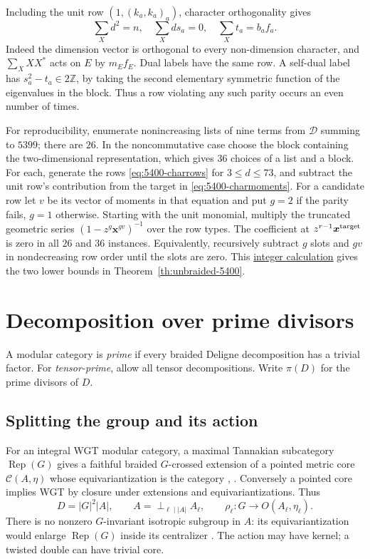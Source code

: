 \documentclass[11pt,a4paper]{article}
\numberwithin{equation}{section}
\theoremstyle{remark}
\newcommand{\C}{\mathcal C}
\newcommand{\Rep}{\operatorname{Rep}}
\newcommand{\ZZ}{\mathbb Z}
\begin{document}
Including the unit row $(1,(k_a,k_a)_a)$, character orthogonality gives
\begin{equation}\label{eq:5400-charmoments}
 \sum_X d^2=n,\quad \sum_X ds_a=0,\quad
 \sum_X t_a=b_a f_a .
\end{equation}
Indeed the dimension vector is orthogonal to every non-dimension
character, and $\sum_X XX^*$ acts on $E$ by $m_Ef_E$.
Dual labels have the same row. A self-dual label has
$s_a^2-t_a\in2\ZZ$, by taking the second elementary symmetric function
of the eigenvalues in the block. Thus a row violating any such parity
occurs an even number of times.

For reproducibility, enumerate nonincreasing lists of nine terms from
$\mathcal D$ summing to $5399$; there are $26$. In the noncommutative
case choose the block containing the two-dimensional representation,
which gives $36$ choices of a list and a block. For each, generate the
rows \eqref{eq:5400-charrows} for $3\le d\le73$, and subtract the unit
row's contribution from the target in \eqref{eq:5400-charmoments}.
For a candidate row let $v$ be its vector of moments in that equation
and put $g=2$ if the parity fails, $g=1$ otherwise.
Starting with the unit monomial, multiply the truncated geometric
series $(1-z^g\boldsymbol{x}^{gv})^{-1}$ over the row types.
The coefficient at $z^{r-1}\boldsymbol{x}^{\rm target}$
is zero in all $26$ and $36$ instances. Equivalently, recursively
subtract $g$ slots and $gv$ in nondecreasing row order until the slots
are zero. This \href{https://github.com/sebastienpalcoux/WGT-fusion-categories/blob/f7f9f9a02f3116e61eb9dca4eebfed77001494e8/code/verify_rank_5400.py}{integer calculation} gives the two lower bounds in
Theorem~\ref{th:unbraided-5400}.

\section{Decomposition over prime divisors}\label{fam:M:sec:13}\label{sec:coprime-core}
A modular category is \emph{prime} if every braided Deligne
decomposition has a trivial factor. For \emph{tensor-prime}, allow
all tensor decompositions. Write $\pi(D)$ for the prime divisors of $D$.
\subsection{Splitting the group and its action}\label{fam:M:sec:13.1}
For an integral WGT modular category, a maximal Tannakian subcategory
$\Rep(G)$ gives a faithful braided $G$-crossed extension of a pointed
metric core $\C(A,\eta)$ whose equivariantization is the category
\cite[Proposition~4.56(i)--(ii), Definition~5.8 and Corollary~5.19]{DGNO},
\cite[Theorem~1.1]{NataleCore}. Conversely a pointed core implies WGT
by closure under extensions and equivariantizations. Thus
\[
 D=|G|^2|A|,\qquad A=\mathop{\perp}_{\ell\mid |A|}A_\ell,
 \qquad \rho_\ell:G\longrightarrow O(A_\ell,\eta_\ell).
\]
There is no nonzero $G$-invariant isotropic subgroup in $A$: its
equivariantization would enlarge $\Rep(G)$ inside its centralizer \cite[Proposition~5.18]{DGNO}.
The action may have kernel; a twisted double can have trivial core.
\end{document}
